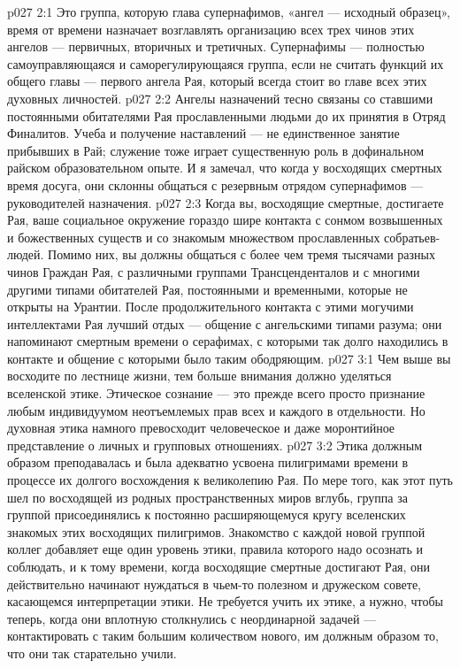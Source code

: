 \vs p027 2:1 Это группа, которую глава супернафимов, «ангел --- исходный образец», время от времени назначает возглавлять организацию всех трех чинов этих ангелов --- первичных, вторичных и третичных. Супернафимы --- полностью самоуправляющаяся и саморегулирующаяся группа, если не считать функций их общего главы --- первого ангела Рая, который всегда стоит во главе всех этих духовных личностей.
\vs p027 2:2 Ангелы назначений тесно связаны со ставшими постоянными обитателями Рая прославленными людьми до их принятия в Отряд Финалитов. Учеба и получение наставлений --- не единственное занятие прибывших в Рай; служение тоже играет существенную роль в дофинальном райском образовательном опыте. И я замечал, что когда у восходящих смертных время досуга, они склонны общаться с резервным отрядом супернафимов --- руководителей назначения.
\vs p027 2:3 Когда вы, восходящие смертные, достигаете Рая, ваше социальное окружение гораздо шире контакта с сонмом возвышенных и божественных существ и со знакомым множеством прославленных собратьев\hyp{}людей. Помимо них, вы должны общаться с более чем тремя тысячами разных чинов Граждан Рая, с различными группами Трансценденталов и с многими другими типами обитателей Рая, постоянными и временными, которые не открыты на Урантии. После продолжительного контакта с этими могучими интеллектами Рая лучший отдых --- общение с ангельскими типами разума; они напоминают смертным времени о серафимах, с которыми так долго находились в контакте и общение с которыми было таким ободряющим.
\vs p027 3:1 Чем выше вы восходите по лестнице жизни, тем больше внимания должно уделяться вселенской этике. Этическое сознание --- это прежде всего просто признание любым индивидуумом неотъемлемых прав всех и каждого в отдельности. Но духовная этика намного превосходит человеческое и даже моронтийное представление о личных и групповых отношениях.
\vs p027 3:2 Этика должным образом преподавалась и была адекватно усвоена пилигримами времени в процессе их долгого восхождения к великолепию Рая. По мере того, как этот путь шел по восходящей из родных пространственных миров вглубь, группа за группой присоединялись к постоянно расширяющемуся кругу вселенских знакомых этих восходящих пилигримов. Знакомство с каждой новой группой коллег добавляет еще один уровень этики, правила которого надо осознать и соблюдать, и к тому времени, когда восходящие смертные достигают Рая, они действительно начинают нуждаться в чьем\hyp{}то полезном и дружеском совете, касающемся интерпретации этики. Не требуется учить их этике, а нужно, чтобы теперь, когда они вплотную столкнулись с неординарной задачей --- контактировать с таким большим количеством нового, им должным образом  то, что они так старательно учили.

